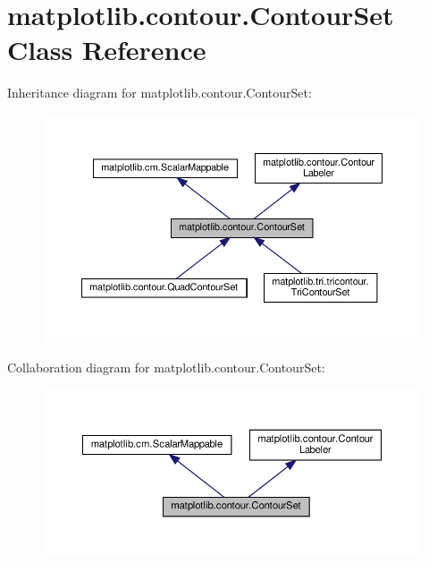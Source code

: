 \hypertarget{classmatplotlib_1_1contour_1_1ContourSet}{}\section{matplotlib.\+contour.\+Contour\+Set Class Reference}
\label{classmatplotlib_1_1contour_1_1ContourSet}


Inheritance diagram for matplotlib.\+contour.\+Contour\+Set\+:
\nopagebreak
\begin{figure}[H]
\begin{center}
\leavevmode
\includegraphics[width=350pt]{classmatplotlib_1_1contour_1_1ContourSet__inherit__graph}
\end{center}
\end{figure}


Collaboration diagram for matplotlib.\+contour.\+Contour\+Set\+:
\nopagebreak
\begin{figure}[H]
\begin{center}
\leavevmode
\includegraphics[width=350pt]{classmatplotlib_1_1contour_1_1ContourSet__coll__graph}
\end{center}
\end{figure}
